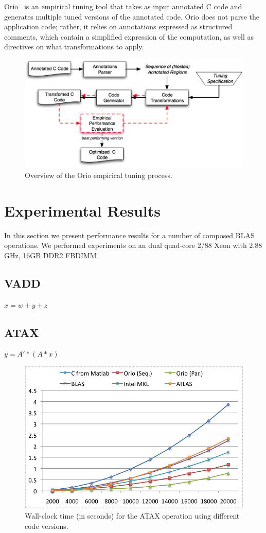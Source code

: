 \documentclass[11pt]{article}
\begin{document}
Orio~\cite{Norris:2007} is an empirical tuning tool that takes as input annotated C code and generates multiple tuned versions of the annotated code. Orio does not parse the application code; rather, it relies on annotations expressed as structured comments, which contain a simplified expression of the computation, as well as directives on what transformations to apply.

\begin{figure}[htbp]
\centering
\includegraphics[width=.7\textwidth]{figures/orio.png}
\caption{Overview of the Orio empirical tuning process.}
\label{fig:orio}
\end{figure}

\section{Experimental Results}
\label{sec:experiments}

In this section we present performance results for a number of composed BLAS operations. We performed experiments on an dual quad-core 2/88 Xeon with 2.88 GHz, 16GB DDR2 FBDIMM

\subsection{VADD}

$x = w + y + z$

\subsection{ATAX}

$y = A' * (A * x)$

\begin{figure}[htp]
\centering
\includegraphics[width=.8\textwidth]{figures/atax.png}
\caption{Wall-clock time (in seconds) for the ATAX operation using different code versions.}
\label{fig:atax}
\end{figure}
\end{document}
